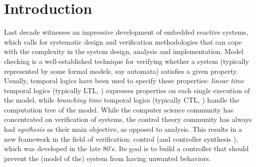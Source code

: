 \documentclass[times, 10 pt,twocolumn]{article}
\begin{document}
%
\section{Introduction} \label{sec1}

Last decade witnesses an impressive development of embedded
reactive systems, which calls for systematic design and
verification methodologies that can cope with the complexity in
the system design, analysis and implementation. Model checking
\cite{CGP00} is a well-established technique for verifying whether
a system (typically represented by some formal models, say
automata) satisfies a given property. Usually, temporal logics
have been used to specify these properties: \emph{linear time}
temporal logics (typically LTL, \cite{Pnu77}) expresses properties
on each single execution of the model, while \emph{branching time}
temporal logics (typically CTL, \cite{CE81, QS82}) handle the
computation tree of the model. While the computer science
community has concentrated on verification of systems, the control
theory community has always had \emph{synthesis} as their main
objective, as opposed to analysis. This results in a new framework
in the field of verification: control (and controller synthesis
\cite{RW89}), which was developed in the late 80's. Its goal is to
build a controller that should prevent the (model of the) system
from having unwanted behaviors.
\end{document}
